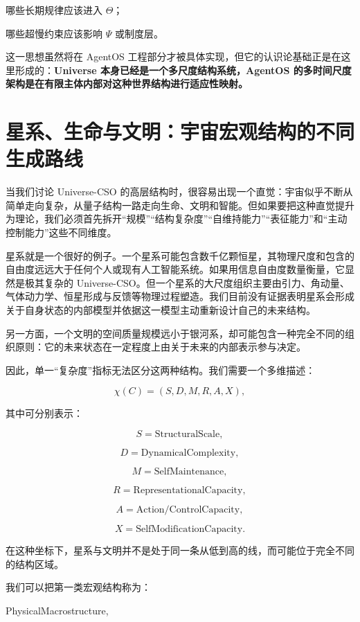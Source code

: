 哪些长期规律应该进入 $\Theta$；

哪些超慢约束应该影响 $\Psi$ 或制度层。

这一思想虽然将在 AgentOS 工程部分才被具体实现，但它的认识论基础正是在这里形成的：\textbf{Universe 本身已经是一个多尺度结构系统，AgentOS 的多时间尺度架构是在有限主体内部对这种世界结构进行适应性映射。}

\section{星系、生命与文明：宇宙宏观结构的不同生成路线}

当我们讨论 Universe-CSO 的高层结构时，很容易出现一个直觉：宇宙似乎不断从简单走向复杂，从量子结构一路走向生命、文明和智能。但如果要把这种直觉提升为理论，我们必须首先拆开“规模”“结构复杂度”“自维持能力”“表征能力”和“主动控制能力”这些不同维度。

星系就是一个很好的例子。一个星系可能包含数千亿颗恒星，其物理尺度和包含的自由度远远大于任何个人或现有人工智能系统。如果用信息自由度数量衡量，它显然是极其复杂的 Universe-CSO。但一个星系的大尺度组织主要由引力、角动量、气体动力学、恒星形成与反馈等物理过程塑造。我们目前没有证据表明星系会形成关于自身状态的内部模型并依据这一模型主动重新设计自己的未来结构。

另一方面，一个文明的空间质量规模远小于银河系，却可能包含一种完全不同的组织原则：它的未来状态在一定程度上由关于未来的内部表示参与决定。

因此，单一“复杂度”指标无法区分这两种结构。我们需要一个多维描述：

\[
\chi(C)
=
\left(
S,
D,
M,
R,
A,
X
\right),
\]

其中可分别表示：

\[
S=\text{StructuralScale},
\]

\[
D=\text{DynamicalComplexity},
\]

\[
M=\text{SelfMaintenance},
\]

\[
R=\text{RepresentationalCapacity},
\]

\[
A=\text{Action/ControlCapacity},
\]

\[
X=\text{SelfModificationCapacity}.
\]

在这种坐标下，星系与文明并不是处于同一条从低到高的线，而可能位于完全不同的结构区域。

我们可以把第一类宏观结构称为：

\begin{statementbox}
PhysicalMacrostructure,
\end{statementbox}

